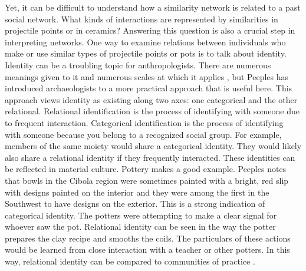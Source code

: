 \documentclass[]{interact}
\theoremstyle{plain}%
\theoremstyle{definition}
\theoremstyle{remark}
\begin{document}
Yet, it can be difficult to understand how a similarity network is
related to a past social network. What kinds of interactions are
represented by similarities in projectile points or in ceramics?
Answering this question is also a crucial step in interpreting networks.
One way to examine relations between individuals who make or use similar
types of projectile points or pots is to talk about identity. Identity
can be a troubling topic for anthropologists. There are numerous
meanings given to it and numerous scales at which it applies
\citep{Brubaker2000-na}, but Peeples \citeyearpar{Peeples2018-ib} has
introduced archaeologists to a more practical approach that is useful
here. This approach views identity as existing along two axes: one
categorical and the other relational. Relational identification is the
process of identifying with someone due to frequent interaction.
Categorical identification is the process of identifying with someone
because you belong to a recognized social group. For example, members of
the same moiety would share a categorical identity. They would likely
also share a relational identity if they frequently interacted. These
identities can be reflected in material culture. Pottery makes a good
example. Peeples \citeyearpar[p.~151]{Peeples2018-ib} notes that bowls
in the Cibola region were sometimes painted with a bright, red slip with
designs painted on the interior and they were among the first in the
Southwest to have designs on the exterior. This is a strong indication
of categorical identity. The potters were attempting to make a clear
signal for whoever saw the pot. Relational identity can be seen in the
way the potter prepares the clay recipe and smooths the coils. The
particulars of these actions would be learned from close interaction
with a teacher or other potters. In this way, relational identity can be
compared to communities of practice \citep{Lave1991-ik, Wenger1998-rx}.
\end{document}
